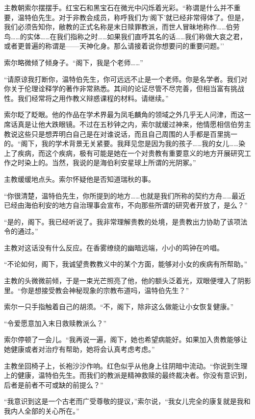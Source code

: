 \documentclass[AutoFakeBold=true]{book}
\begin{document}
主教朝索尔摆摆手。红宝石和黑宝石在微光中闪烁着光彩。``称谓是什么并不重要，温特伯先生。对于非教会成员，称呼我们为`阁下'就已经非常得体了。但是，我们必须告知你，敝教的正式名称是末日赎罪教派，而世人冒昧地称作……伯劳鸟……的实体……在我们指称之时……如果我们直呼其名的话……我们称做大哀之君，或者更普遍的称谓是——天神化身。那么请接着说你想要问的重要问题。''

索尔略微倾了倾身子。``阁下，我是个老师……''

``请原谅我打断你，温特伯先生，你可远远不止是一个老师。你是名学者。我们对你关于伦理诠释学的著作非常熟悉。其间的论证尽管不尽完善，但相当富有挑战性。我们经常将之用作教义辩惑课程的材料。请继续。''

索尔眨了眨眼。他的作品在学术界最为凤毛麟角的领域之外几乎无人问津，而这一席话真是让他大跌眼镜。不过在五秒钟之内，索尔就缓过神来，他情愿相信伯劳主教说这些只是想弄明白自己是在对谁说话，而且自己周围的人手都是百里挑一的。``阁下，我的学术背景无关紧要。我拜见您是因为我的孩子……我的女儿……染上了疾病，而这个疾病，极有可能是她在一个对贵教有重要意义的地方开展研究工作之时染上的。当然，我说的是海伯利安星球上所谓的光阴冢。''

主教缓缓地点头。索尔怀疑他是否知道瑞秋的事。

``你很清楚，温特伯先生，你所提到的地方……也就是我们所称的契约方舟……最近已经由海伯利安的地方自治理事会宣布，不向那些所谓的研究者开放了，是么？''

``是的，阁下。我已经听说了。我非常理解贵教的处境，是贵教出力协助了该项法令的通过。''

主教对这话没有什么反应。在香雾缭绕的幽暗远端，小小的鸣钟在吟唱。

``不论如何，阁下，我诚望贵教教义中的某个方面，能够对小女的疾病有所帮助。''

主教的头微微前倾，于是一束光芒照亮了他，他的额头泛着光，双眼便埋入了阴影里。``你是想接受教会神秘现象的宗教布道吗，温特伯先生？''

索尔一只手指触着自己的胡须。``不，阁下，除非这么做能让小女恢复健康。''

``令爱愿意加入末日救赎教派么？''

索尔停顿了一会儿。``我再说一遍，阁下，她也希望病能好。如果加入贵教能够让她健康或者对治疗有帮助，她将会认真考虑考虑。''

主教坐回椅子上，长袍沙沙作响。红色似乎从他身上往阴暗中流动。``你说到生理上的健康，温特伯先生。而我们的教派是精神救赎的最终裁决者。你没有意识到，后者是前者不可或缺的前提么？''

``我意识到这是一个古老而广受尊敬的提议，''索尔说，``我女儿完全的康复就是我和我内人全部的关心所在。''
\end{document}
